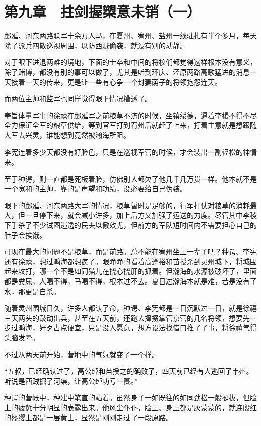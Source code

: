 \section{第九章　拄剑握槊意未销（一）}

鄜延、河东两路联军十余万人马，在夏州、宥州、盐州一线驻扎有半个多月，每天除了派兵四散巡视周围，以防西贼偷袭，就没有别的动静。

对于眼下进退两难的境地，下面的士卒和中间的将校们都觉得这样根本没有意义，除了赌博，都没有别的事可以做了，尤其是听到环庆、泾原两路高歌猛进的消息一天接着一天的传来，更是让一些有心争一个封妻荫子的将领抱怨连天。

而两位主帅和监军也同样觉得眼下情况糟透了。

奉旨体量军事的徐禧在鄜延军之前粮草不济的时候，坐镇绥德，逼着李稷不得不尽全力保证全军的粮草供给，等到官军打到宥州后就赶了上来，打着主意就是想跟随大军去兴灵，谁能想到竟然被瀚海所阻。

李宪连着多少天都没有好脸色，只是在巡视军营的时候，才会装出一副轻松的神情来。

至于种谔，则一直都是死板着脸，仿佛别人都欠了他几千几万贯一样。他本就不是一个宽和的主帅，靠的是声望和功绩，没必要给自己伪装。

眼下的鄜延、河东两路大军的情况，粮草暂时是足够的，行军打仗对粮草的消耗最大，但一旦停下来，就会减小许多，加上后方又加强了运送的力度。尽管其中李稷下手杀了不少试图逃逸的民夫以儆效尤，但前方的军队短时间内不需要担心自己的肚子会挨饿。

可现在最大的问题不是粮草，而是前路。总不能在宥州坐上一辈子吧？种谔、李宪还有徐禧，想过瀚海都想疯了。眼睁睁的看着高遵裕和苗授杀到灵州城下，将城围起来攻打，哪一个不是如同猫儿在挠心挠肝的抓着。但瀚海的水源被破坏了，里面都是粪尿，人喝不得，马喝不得，根本过不去。夏日过瀚海本就是难，若是没有了水，那更是自杀。

随着灵州围城日久，许多人都认了命，种谔、李宪都是一日沉默过一日，就是徐禧三天两头的鼓动出兵，甚至在五天前，还跑去撺掇掌管京营的几名将领，想要先一步过瀚海，好歹占点便宜，只是没人愿意，想方设法找借口推了了事，将徐禧气得头脑发晕。

不过从两天前开始，营地中的气氛就变了一个样。

“五叔，已经确认过了，高公绰和苗授之的确败了，四天前已经有人逃回了韦州。听说是西贼掘了河渠，让高公绰功亏一篑。”

种谔的营帐中，种建中笔直的站着。虽然身子一如既往的如同劲松一般挺拔，但脸上的疲惫十分明显的表露出来。他风尘仆仆，脸上、身上都是灰蒙蒙的，就连殷红的盔缨上都是一层黄土，显然是刚刚走过了一段原路。

